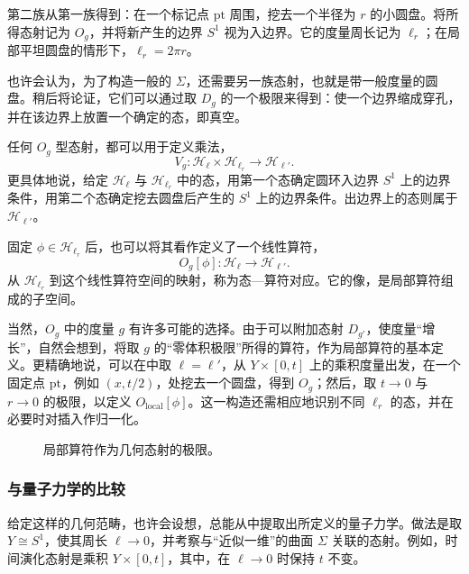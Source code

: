 第二族从第一族得到：在一个标记点 $\mathrm{pt}$ 周围，挖去一个半径为 $r$ 的小圆盘。将所得态射记为 $O_g$，并将新产生的边界 $S^1$ 视为入边界。它的度量周长记为 $\ell_r$；在局部平坦圆盘的情形下，$\ell_r=2\pi r$。

也许会认为，为了构造一般的 $\Sigma$，还需要另一族态射，也就是带一般度量的圆盘。稍后将论证，它们可以通过取 $D_g$ 的一个极限来得到：使一个边界缩成穿孔，并在该边界上放置一个确定的态，即真空。

任何 $O_g$ 型态射，都可以用于定义乘法，
\begin{equation}\label{eq:3.20}
V_g\colon\mathcal{H}_\ell\times\mathcal{H}_{\ell_r}
\longrightarrow\mathcal{H}_{\ell'}.
\end{equation}
更具体地说，给定 $\mathcal{H}_\ell$ 与 $\mathcal{H}_{\ell_r}$ 中的态，用第一个态确定圆环入边界 $S^1$ 上的边界条件，用第二个态确定挖去圆盘后产生的 $S^1$ 上的边界条件。出边界上的态则属于 $\mathcal{H}_{\ell'}$。

固定 $\phi\in\mathcal{H}_{\ell_r}$ 后，也可以将其看作定义了一个线性算符，
\begin{equation}\label{eq:3.21}
O_g[\phi]\colon\mathcal{H}_\ell\longrightarrow\mathcal{H}_{\ell'}.
\end{equation}
从 $\mathcal{H}_{\ell_r}$ 到这个线性算符空间的映射，称为态—算符对应。它的像，是局部算符组成的子空间。

当然，$O_g$ 中的度量 $g$ 有许多可能的选择。由于可以附加态射 $D_{g'}$，使度量“增长”，自然会想到，将取 $g$ 的“零体积极限”所得的算符，作为局部算符的基本定义。更精确地说，可以在中取 $\ell=\ell'$，从 $Y\times[0,t]$ 上的乘积度量出发，在一个固定点 $\mathrm{pt}$，例如 $(x,t/2)$，处挖去一个圆盘，得到 $O_g$；然后，取 $t\to0$ 与 $r\to0$ 的极限，以定义 $O_{\mathrm{local}}[\phi]$。这一构造还需相应地识别不同 $\ell_r$ 的态，并在必要时对插入作归一化。
\begin{figure}[H]
\centering
{}
\caption{局部算符作为几何态射的极限。}\label{fig:3.3}
\end{figure}

\subsubsection{与量子力学的比较}\label{sec:3.2.1.1}

给定这样的几何范畴，也许会设想，总能从中提取出所定义的量子力学。做法是取 $Y\cong S^1$，使其周长 $\ell\to0$，并考察与“近似一维”的曲面 $\Sigma$ 关联的态射。例如，时间演化态射是乘积 $Y\times[0,t]$，其中，在 $\ell\to0$ 时保持 $t$ 不变。

